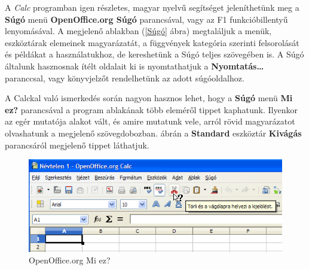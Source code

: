 A \textit{Calc} programban igen részletes, magyar nyelvű
segítséget jeleníthetünk meg a \textbf{Súgó} menü
\textbf{OpenOffice.org Súgó} parancsával, vagy az F1
funkcióbillentyű lenyomásával. A megjelenő ablakban (\ref{Súgó}
ábra) megtaláljuk a menük, eszköztárak elemeinek
magyarázatát, a függvények kategória szerinti
felsorolását és példákat a használatukhoz, de kereshetünk
a Súgó teljes szövegében is.
A Súgó általunk hasznosnak ítélt oldalait ki is nyomtathatjuk
a \textbf{Nyomtatás\dots} paranccsal,  vagy könyvjelzőt
rendelhetünk az adott súgóoldalhoz.

A Calckal való ismerkedés során nagyon hasznos lehet, hogy a
\textbf{Súgó} menü \textbf{Mi ez?} parancsával a program
ablakának több eleméről tippet kaphatunk. Ilyenkor az egér
mutatója alakot vált, és amire mutatunk vele, arról rövid
magyarázatot olvashatunk a megjelenő szövegdobozban. 
ábrán a \textbf{Standard} eszköztár \textbf{Kivágás}
parancsáról megjelenő tippet láthatjuk.
\begin{figure}[!h]
\begin{center}
\includegraphics[width=14.736cm]{oocalcv2-img4.png}
\caption{OpenOffice.org Mi ez?}\label{Miez}
\end{center}
\end{figure}
